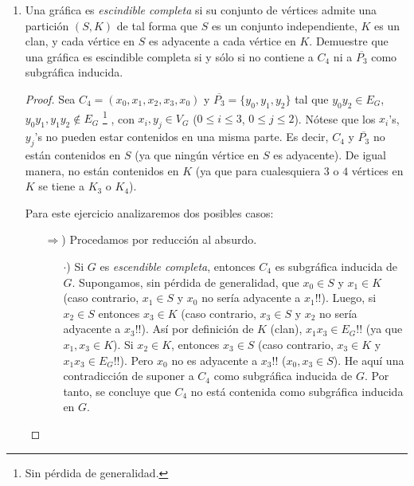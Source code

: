 \documentclass{article}
\begin{document}
\begin{enumerate}
  \item Una gr\'afica es \textit{escindible completa} si su conjunto de
    v\'ertices admite una partici\'on $(S,K)$ de tal forma que $S$ es un
    conjunto independiente, $K$ es un clan, y cada v\'ertice en $S$ es adyacente
    a cada v\'ertice en $K$. Demuestre que una gr\'afica es escindible
    completa si y s\'olo si no contiene a $C_4$ ni a $\overline{P_3}$ como
    subgr\'afica inducida.

    \renewcommand\qedsymbol{QED}
    \begin{proof}
      Sea $C_4 = (x_0, x_1, x_2, x_3, x_0)$ y $\overline{P_3} = \{y_0, y_1, y_2\}$
      tal que $y_0 y_2 \in E_G$, $y_0 y_1, y_1 y_2 \notin E_G$ \footnote{Sin pérdida de generalidad.}
      , con $x_i, y_j \in V_G$ ($0 \leq i \leq 3$, $0 \leq j \leq 2$).
      N\'otese que los $x_i$'s, $y_j$'s no pueden estar contenidos en una misma parte.
      Es decir, $C_4$ y $\overline{P_3}$ no est\'an contenidos en $S$ (ya que ning\'un
      v\'ertice en $S$ es adyacente). De igual manera, no est\'an contenidos en $K$
      (ya que para cualesquiera $3$ o $4$ v\'ertices en $K$ se tiene a $K_3$ o $K_4$).

      Para este ejercicio analizaremos dos posibles casos:
      \begin{itemize}
        \item[$\Rightarrow$)] Procedamos por reducción al absurdo.
          \begin{itemize}
            \item[$\cdot$)] Si $G$ es \textit{escendible completa}, entonces $C_4$ es
              subgr\'afica inducida de $G$.
              Supongamos, sin p\'erdida de generalidad, que $x_0 \in S$ y $x_1 \in K$
              (caso contrario, $x_1 \in S$ y $x_0$ no ser\'ia adyacente a $x_1$!!).
              Luego, si $x_2 \in S$ entonces $x_3 \in K$ (caso contrario, $x_3 \in S$
              y $x_2$ no ser\'ia adyacente a $x_3$!!).
              As\'i por definici\'on de $K$ (clan), $x_1 x_3 \in E_G$!!
              (ya que $x_1, x_3 \in K$).
              Si $x_2 \in K$, entonces $x_3 \in S$ (caso contrario, $x_3 \in K$ y
              $x_1 x_3 \in E_G$!!). Pero $x_0$ no es adyacente a $x_3$!! ($x_0, x_3
              \in S$). He aqu\'i una contradicci\'on de suponer a $C_4$ como subgr\'afica
              inducida de $G$.
              Por tanto, se concluye que $C_4$ no est\'a contenida como subgr\'afica
              inducida en $G$.


\end{itemize}
\end{itemize}
\end{proof}
\end{enumerate}
\end{document}
